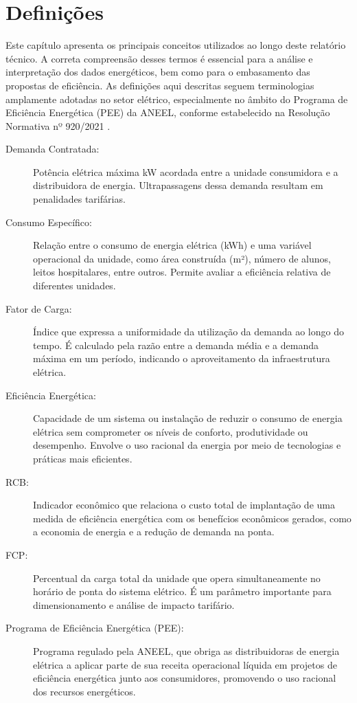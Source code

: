 \chapter{Definições}


Este capítulo apresenta os principais conceitos utilizados ao longo deste relatório técnico. A correta compreensão desses termos é essencial para a análise e interpretação dos dados energéticos, bem como para o embasamento das propostas de eficiência. As definições aqui descritas seguem terminologias amplamente adotadas no setor elétrico, especialmente no âmbito do Programa de Eficiência Energética (\ac{PEE}) da \ac{ANEEL}, conforme estabelecido na Resolução Normativa nº 920/2021 \cite{aneel920}.


\begin{description}
    \item[Demanda Contratada:] Potência elétrica máxima kW  acordada entre a unidade consumidora e a distribuidora de energia. Ultrapassagens dessa demanda resultam em penalidades tarifárias.
    
    \item[Consumo Específico:] Relação entre o consumo de energia elétrica (kWh) e uma variável operacional da unidade, como área construída (m²), número de alunos, leitos hospitalares, entre outros. Permite avaliar a eficiência relativa de diferentes unidades.
    
    \item[Fator de Carga:] Índice que expressa a uniformidade da utilização da demanda ao longo do tempo. É calculado pela razão entre a demanda média e a demanda máxima em um período, indicando o aproveitamento da infraestrutura elétrica.
    
    \item[Eficiência Energética:] Capacidade de um sistema ou instalação de reduzir o consumo de energia elétrica sem comprometer os níveis de conforto, produtividade ou desempenho. Envolve o uso racional da energia por meio de tecnologias e práticas mais eficientes.
    
    \item[\ac{RCB}:] Indicador econômico que relaciona o custo total de implantação de uma medida de eficiência energética com os benefícios econômicos gerados, como a economia de energia e a redução de demanda na ponta.
    
    \item[\ac{FCP}:] Percentual da carga total da unidade que opera simultaneamente no horário de ponta do sistema elétrico. É um parâmetro importante para dimensionamento e análise de impacto tarifário.
    
    \item[Programa de Eficiência Energética (\ac{PEE}):] Programa regulado pela \ac{ANEEL}, que obriga as distribuidoras de energia elétrica a aplicar parte de sua receita operacional líquida em projetos de eficiência energética junto aos consumidores, promovendo o uso racional dos recursos energéticos.
\end{description}
